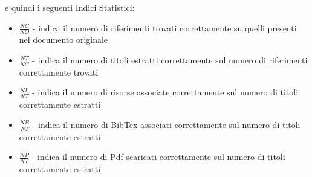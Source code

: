 e quindi i seguenti Indici Statistici:
\begin{itemize}
 \item \textbf{$\frac{NC}{NO}$} - indica il numero di riferimenti trovati correttamente su quelli presenti nel documento originale
 \item \textbf{$\frac{NT}{NC}$} - indica il numero di titoli estratti correttamente sul numero di riferimenti correttamente trovati
 \item \textbf{$\frac{NL}{NT}$} - indica il numero di risorse associate correttamente sul numero di titoli correttamente estratti
 \item \textbf{$\frac{NB}{NT}$} - indica il numero di BibTex associati correttamente sul numero di titoli correttamente estratti
 \item \textbf{$\frac{NP}{NT}$} - indica il numero di Pdf scaricati correttamente sul numero di titoli correttamente estratti
\end{itemize}

